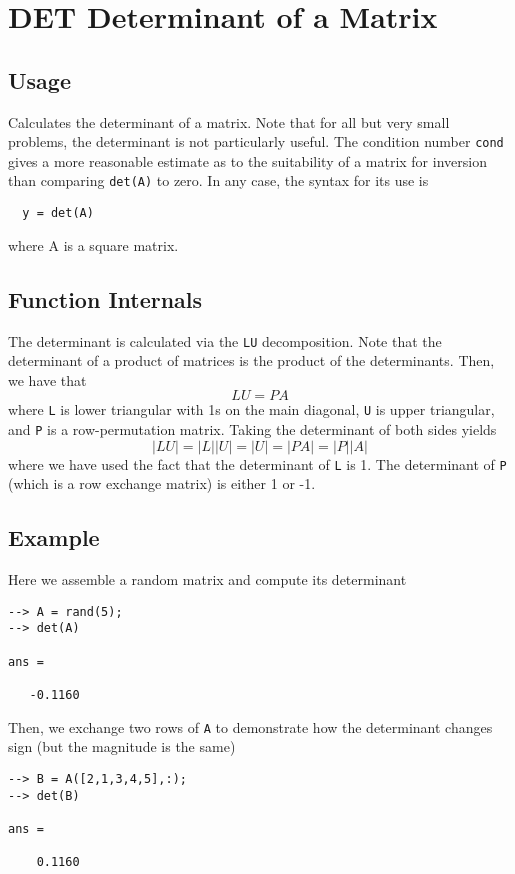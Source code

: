 \section{DET Determinant of a Matrix}

\subsection{Usage}

Calculates the determinant of a matrix.  Note that for all but
very small problems, the determinant is not particularly useful.
The condition number \verb|cond| gives a more reasonable estimate as
to the suitability of a matrix for inversion than comparing \verb|det(A)|
to zero.  In any case, the syntax for its use is
\begin{verbatim}
  y = det(A)
\end{verbatim}
where A is a square matrix.
\subsection{Function Internals}

The determinant is calculated via the \verb|LU| decomposition.  Note that
the determinant of a product of matrices is the product of the 
determinants.  Then, we have that 
\[
  L U = P A
\]
where \verb|L| is lower triangular with 1s on the main diagonal, \verb|U| is
upper triangular, and \verb|P| is a row-permutation matrix.  Taking the
determinant of both sides yields
\[
 |L U| = |L| |U| = |U| = |P A| = |P| |A|
\]
where we have used the fact that the determinant of \verb|L| is 1.  The
determinant of \verb|P| (which is a row exchange matrix) is either 1 or 
-1.
\subsection{Example}

Here we assemble a random matrix and compute its determinant
\begin{verbatim}
--> A = rand(5);
--> det(A)

ans = 

   -0.1160 
\end{verbatim}
Then, we exchange two rows of \verb|A| to demonstrate how the determinant
changes sign (but the magnitude is the same)
\begin{verbatim}
--> B = A([2,1,3,4,5],:);
--> det(B)

ans = 

    0.1160 
\end{verbatim}
